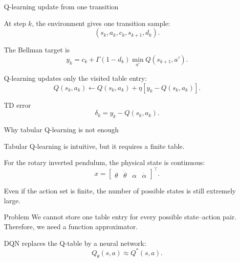 \documentclass[aspectratio=169]{beamer}
\begin{document}
\begin{frame}{Q-learning update from one transition}

At step \(k\), the environment gives one transition sample:
\[
(s_k,a_k,c_k,s_{k+1},d_k).
\]



The Bellman target is
\[
y_k
=
c_k
+
\Gamma(1-d_k)
\min_{a'}Q(s_{k+1},a').
\]



Q-learning updates only the visited table entry:
\[
Q(s_k,a_k)
\leftarrow
Q(s_k,a_k)
+
\eta
\left[
y_k-Q(s_k,a_k)
\right].
\]



\begin{block}{TD error}
\small
\[
\delta_k=y_k-Q(s_k,a_k).
\]
\end{block}

\end{frame}


\begin{frame}{Why tabular Q-learning is not enough}

Tabular Q-learning is intuitive, but it requires a finite table.

\vspace{0.2cm}

For the rotary inverted pendulum, the physical state is continuous:
\[
x=
\begin{bmatrix}
\theta & \dot\theta & \alpha & \dot\alpha
\end{bmatrix}^{\top}.
\]

\vspace{0.2cm}

Even if the action set is finite, the number of possible states is still extremely large.

\vspace{0.2cm}

\begin{alertblock}{Problem}
\small
We cannot store one table entry for every possible state--action pair.
Therefore, we need a function approximator.
\end{alertblock}

\vspace{0.15cm}

DQN replaces the Q-table by a neural network:
\[
Q_\theta(s,a)\approx Q^*(s,a).
\]

\end{frame}
\end{document}
